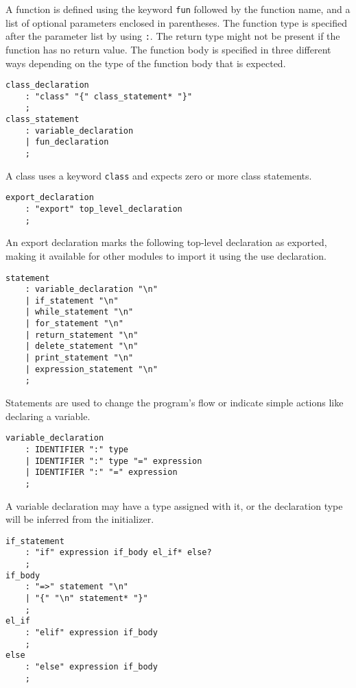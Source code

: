 A function is defined using the keyword \texttt{fun} followed by the function name, and a list of optional parameters enclosed in parentheses.
The function type is specified after the parameter list by using \texttt{:}. The return type might not be present if the function has no return value.
The function body is specified in three different ways depending on the type of the function body that is expected.

\begin{lstlisting}
class_declaration
    : "class" "{" class_statement* "}"
    ;
class_statement
    : variable_declaration
    | fun_declaration
    ;
\end{lstlisting}

A class uses a keyword \texttt{class} and expects zero or more class statements.

\begin{lstlisting}
export_declaration
    : "export" top_level_declaration
    ;
\end{lstlisting}

An export declaration marks the following top-level declaration as exported, making it available for other modules to import it using the
use declaration.

\begin{lstlisting}
statement
    : variable_declaration "\n"
    | if_statement "\n"
    | while_statement "\n"
    | for_statement "\n"
    | return_statement "\n"
    | delete_statement "\n"
    | print_statement "\n"
    | expression_statement "\n"
    ;
\end{lstlisting}

Statements are used to change the program's flow or indicate simple actions like declaring a variable.

\begin{lstlisting}
variable_declaration
    : IDENTIFIER ":" type
    | IDENTIFIER ":" type "=" expression
    | IDENTIFIER ":" "=" expression
    ;
\end{lstlisting}

A variable declaration may have a type assigned with it, or the declaration type will be inferred from the initializer.

\begin{lstlisting}
if_statement
    : "if" expression if_body el_if* else?
    ;
if_body
    : "=>" statement "\n"
    | "{" "\n" statement* "}"
    ;
el_if
    : "elif" expression if_body
    ;
else
    : "else" expression if_body
    ;
\end{lstlisting}

